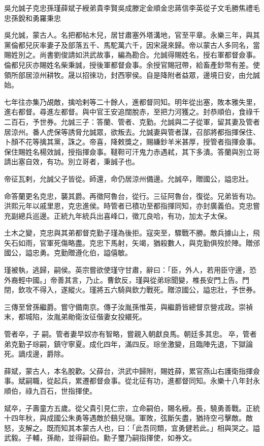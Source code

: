 
\begin{pinyinscope}
吳允誠子克忠孫瑾薛斌子綬弟貴李賢吳成滕定金順金忠蔣信李英從子文毛勝焦禮毛忠孫銳和勇羅秉忠

吳允誠，蒙古人。名把都帖木兒，居甘肅塞外塔溝地，官至平章。永樂三年，與其黨倫都兒灰率妻子及部落五千、馬駝萬六千，因宋晟來歸。帝以蒙古人多同名，當賜姓別之。尚書劉俊請如洪武故事，編為勘合。允誠得賜姓名，授右軍都督僉事。倫都兒灰亦賜姓名柴秉誠，授後軍都督僉事。余授官賜冠帶，給畜產鈔幣有差。使領所部居涼州耕牧。晟以招徠功，封西寧侯。自是降附者益眾，邊境日安，由允誠始。

七年往亦集乃覘敵，擒哈剌等二十餘人，進都督同知。明年從出塞，敗本雅失里，進右都督。尋進左都督。與中官王安追闊脫赤，至把力河獲之。封恭順伯，食祿千二百石，予世券。允誠三子：答蘭、管者、克勤。允誠與二子從軍，留其妻及管者居涼州。番人虎保等誘脅允誠眾，欲叛去。允誠妻與管者謀，召部將都指揮保住、卜顏不花等擒其黨，誅之。帝喜，降敕獎之，賜縑鈔羊米甚厚，授管者指揮僉事。保住賜姓名楊效誠，授指揮僉事。韃靼可汗鬼力赤遇弒，其下多潰。答蘭與別立哥請出塞自效，有功。別立哥者，秉誠子也。

帝征瓦剌，允誠父子皆從。師還，命仍居涼州備邊。允誠卒，贈國公，謚忠壯。

命答蘭更名克忠，襲其爵。再徵阿魯台，從行。三征阿魯台，復從。兄弟皆有功。洪熙元年以戚里恩，克忠進侯。時管者已積功至都指揮同知，亦封廣義伯。克忠嘗充副總兵巡邊。正統九年統兵出喜峰口，徵兀良哈，有功，加太子太保。

土木之變，克忠與其弟都督克勤子瑾為後拒。寇突至，驟戰不勝。敵兵據山上，飛矢石如雨，官軍死傷略盡。克忠下馬射，矢竭，猶殺數人，與克勤俱歿於陣。贈邠國公，謚忠勇。克勤贈遵化伯，謚僖敏。

瑾被執，逃歸，嗣侯。英宗嘗欲使瑾守甘肅，辭曰：「臣，外人，若用臣守邊，恐外裔輕中國。」帝善其言，乃止。曹欽反，瑾與從弟琮聞變，椎長安門上告。門閉，欽攻不得入，遂縱火。瑾將五六騎與欽力戰死。贈涼國公，謚忠壯，予世券。

三傳至曾孫繼爵。嘗守備南京。傳子汝胤孫惟英，與繼爵皆總督京營戎政。崇禎末，都城陷，汝胤弟勛衛汝征偕妻女投繯死。

管者卒，子嗣。管者妻早奴亦有智略，嘗親入朝獻良馬。朝廷多其忠。卒，管者弟克勤子琮嗣，鎮守寧夏。成化四年，滿四反。琮坐激變，且臨陣先退，下獄論死。謫戍邊，爵除。

薛斌，蒙古人，本名脫歡。父薛台，洪武中歸附，賜姓薛，累官燕山右護衛指揮僉事。斌嗣職，從起兵，累遷都督僉事。從北征有功，進都督同知。永樂十八年封永順伯，祿九百石，世指揮使。

斌卒，子壽童方五歲。從父貴引見仁宗，立命嗣伯，賜名綬。長，驍勇善戰。正統十四年秋，與成國公朱勇等遇敵於鷂兒嶺。軍敗，弦斷矢盡，猶持空弓擊敵。敵怒，支解之。既而知其本蒙古人也，曰：「此吾同類，宜勇健若此。」相與哭之。謚武毅。子輔，孫勛，並得嗣伯。勳子璽乃嗣指揮使，如券文。


\end{pinyinscope}
